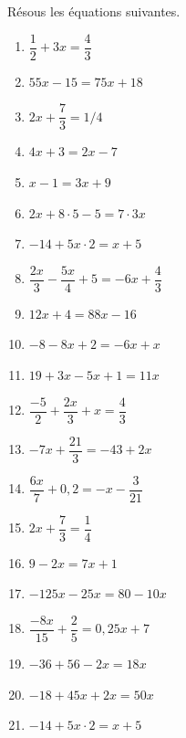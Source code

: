\documentclass[parskip=half-]{scrartcl}
\begin{document}
\begin{exercise}
    Résous les équations suivantes.
    \begin{enumerate}[cols=2, itemsep=0.4cm]
        \item \(\dfrac{1}{2}+3x=\dfrac{4}{3}\)
        \item \(55x-15=75x+18\)
        \item \(2x+\dfrac{7}{3}=1/4\)
        \item \(4x+3=2x-7\)
        \item \(x-1=3x+9\)
        \item \(2x+8\cdot 5-5=7\cdot 3x\)
        \item \(-14+5x\cdot 2=x+5\)
        \item \(\dfrac{2x}{3}-\dfrac{5x}{4}+5=-6x+\dfrac{4}{3}\)
        \item \(12x+4=88x-16\)
        \item \(-8-8x+2=-6x+x\)
        \item \(19+3x-5x+1=11x\)
        \item \(\dfrac{-5}{2}+\dfrac{2x}{3}+x=\dfrac{4}{3}\)
        \item \(-7x+\dfrac{21}{3}=-43+2x\)
        \item \(\dfrac{6x}{7}+0,2=-x-\dfrac{3}{21}  \)
        \item \( 2x+\dfrac{7}{3}=\dfrac{1}{4}\)
        \item \(9-2x=7x+1\)
        \item \(-125x-25x=80-10x \)
        \item \(\dfrac{-8x}{15}+\dfrac{2}{5}=0,25x+7\)
        \item \(-36+56-2x=18x\)
        \item \(-18+45x+2x=50x\)
        \item \(-14+5x\cdot 2=x+5\)
    \end{enumerate}
\end{exercise}
\end{document}
